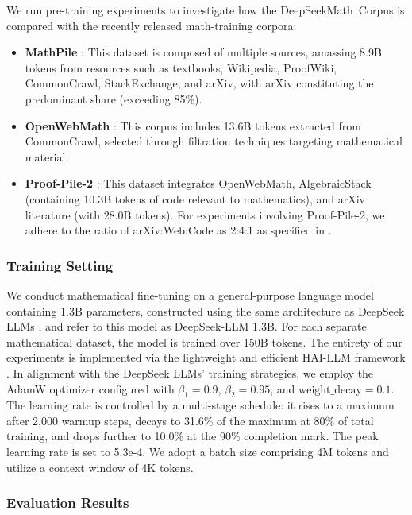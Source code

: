 \begin{itemize}[topsep=0pt]
We run pre-training experiments to investigate how the DeepSeekMath~Corpus is compared with the recently released math-training corpora:

\begin{itemize}[topsep=0pt]
    \item \textbf{MathPile} \citep{mathpile}: This dataset is composed of multiple sources, amassing 8.9B tokens from resources such as textbooks, Wikipedia, ProofWiki, CommonCrawl, StackExchange, and arXiv, with arXiv constituting the predominant share (exceeding 85\%).
    \item \textbf{OpenWebMath} \citep{openwebmath}: This corpus includes 13.6B tokens extracted from CommonCrawl, selected through filtration techniques targeting mathematical material.
    \item \textbf{Proof-Pile-2} \citep{llemma}: This dataset integrates OpenWebMath, AlgebraicStack (containing 10.3B tokens of code relevant to mathematics), and arXiv literature (with 28.0B tokens). For experiments involving Proof-Pile-2, we adhere to the ratio of arXiv:Web:Code as 2:4:1 as specified in \cite{llemma}.
\end{itemize}

\subsubsection{Training Setting}
\label{sec:quality-policy}
We conduct mathematical fine-tuning on a general-purpose language model containing 1.3B parameters, constructed using the same architecture as DeepSeek LLMs \citep{deepseek-llm}, and refer to this model as DeepSeek-LLM 1.3B. For each separate mathematical dataset, the model is trained over 150B tokens. The entirety of our experiments is implemented via the lightweight and efficient HAI-LLM framework \citep{haillm}. In alignment with the DeepSeek LLMs' training strategies, we employ the AdamW optimizer \citep{adamW} configured with $\beta_1=0.9$, $\beta_2=0.95$, and $\mathrm{weight\_decay}=0.1$. The learning rate is controlled by a multi-stage schedule: it rises to a maximum after 2,000 warmup steps, decays to 31.6\% of the maximum at 80\% of total training, and drops further to 10.0\% at the 90\% completion mark. The peak learning rate is set to 5.3e-4. We adopt a batch size comprising 4M tokens and utilize a context window of 4K tokens.

\subsubsection{Evaluation Results}


\end{itemize}
